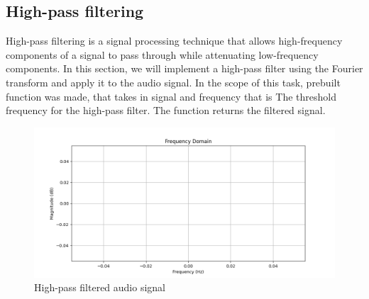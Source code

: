 \documentclass[a4paper,12pt,fleqn]{article}
\begin{document}
\subsection{High-pass filtering}

\hspace{1 em} High-pass filtering is a signal processing technique that allows high-frequency components of a signal to pass through while attenuating low-frequency components. In this section, we will implement a high-pass filter using the Fourier transform and apply it to the audio signal.
In the scope of this task, prebuilt function was made, that takes in signal and frequency that is The
threshold frequency for the high-pass filter. The function returns the filtered signal.

\begin{figure}
    \centering
    \includegraphics[width=1\textwidth]{high_pass_filter.png}
    \caption{High-pass filtered audio signal}
    \label{fig:high_pass_filter}
\end{figure}
\end{document}
